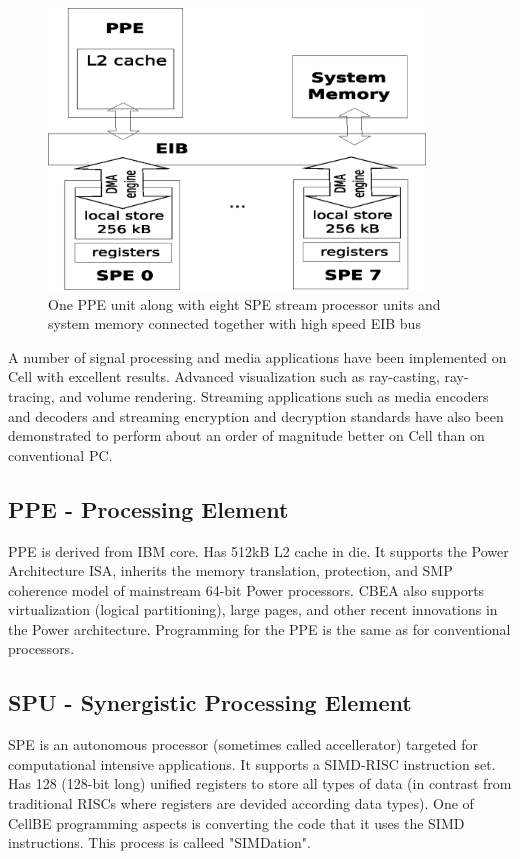 \begin{figure}
    \centering
    \includegraphics[width=10cm]{data/cellLayout.eps}
    \caption[CellBE processor layout]{One PPE unit along with eight SPE stream processor units and system memory connected together with high speed EIB bus}
    \label{fg:processorLayout}
\end{figure}

A number of signal processing and media applications have been implemented on Cell with excellent results. Advanced visualization such as ray-casting, ray-tracing, and volume rendering. Streaming applications such as media encoders and decoders and streaming encryption and decryption standards have also been demonstrated to perform about an order of magnitude better on Cell than on conventional PC.

\subsection{PPE -  Processing Element}
PPE is derived from IBM  core. Has 512kB L2 cache in die. It supports the Power Architecture ISA, inherits the memory translation, protection, and SMP coherence model of mainstream 64-bit Power processors. CBEA also supports virtualization (logical partitioning), large pages, and other recent innovations in the Power architecture. Programming for the PPE is the same as for conventional processors.

\subsection{SPU - Synergistic Processing Element}
SPE is an autonomous processor (sometimes called accellerator) targeted for computational intensive applications. It supports a SIMD-RISC instruction set. Has 128 (128-bit long) unified registers to store all types of data (in contrast from traditional RISCs where registers are devided according data types). One of CellBE programming aspects is converting the code that it uses the SIMD instructions. This process is calleed "SIMDation".

